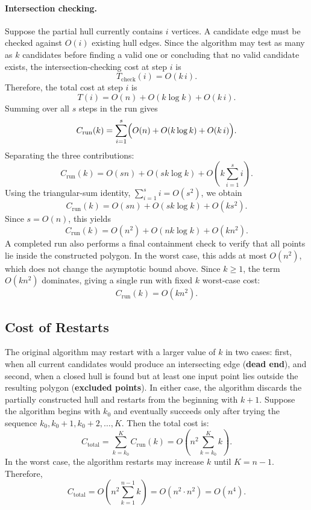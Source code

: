 \documentclass[a4paper,twoside]{article}
\begin{document}
\paragraph{Intersection checking.}
Suppose the partial hull currently contains $i$ vertices. A candidate edge must be checked against $O(i)$ existing hull edges. Since the algorithm may test as many as $k$ candidates before finding a valid one or concluding that no valid candidate exists, the intersection-checking cost at step $i$ is
\[
T_{\mathrm{check}}(i)=O(k\,i).
\]
Therefore, the total cost at step $i$ is
\[
T(i)=O(n)+O(k\log k)+O(k\,i).
\]
Summing over all $s$ steps in the run gives
\[
C_{\mathrm{run}}(k)
=
\sum_{i=1}^{s}\Bigl(O(n)+O(k\log k)+O(k\,i)\Bigr).
\]
Separating the three contributions:
\[
C_{\mathrm{run}}(k)
=
O(sn)+O(sk\log k)+O\!\left(k\sum_{i=1}^{s} i\right).
\]
Using the triangular-sum identity, $\sum_{i=1}^{s} i = O(s^2)$, we obtain
\[
C_{\mathrm{run}}(k)=O(sn)+O(sk\log k)+O(ks^2).
\]
Since $s = O(n)$, this yields
\[
C_{\mathrm{run}}(k)=O(n^2)+O(nk\log k)+O(kn^2).
\]
A completed run also performs a final containment check to verify that all points lie inside the constructed polygon. In the worst case, this adds at most $O(n^2)$, which does not change the asymptotic bound above.
Since $k \ge 1$, the term $O(kn^2)$ dominates, giving a single run with fixed $k$ worst-case cost:
\[
\boxed{C_{\mathrm{run}}(k)=O(kn^2).}
\]
\subsection{Cost of Restarts}
The original algorithm may restart with a larger value of $k$ in two cases: first, when all current candidates would produce an intersecting edge (\textbf{dead end}), and second, when a closed hull is found but at least one input point lies outside the resulting polygon (\textbf{excluded points}). In either case, the algorithm discards the partially constructed hull and restarts from the beginning with $k+1$.
Suppose the algorithm begins with $k_0$ and eventually succeeds only after trying the sequence $k_0, k_0+1, k_0+2, \dots, K$. Then the total cost is:
\[
C_{\mathrm{total}}
=
\sum_{k=k_0}^{K} C_{\mathrm{run}}(k)
=
O\!\left(n^2 \sum_{k=k_0}^{K} k\right).
\]
In the worst case, the algorithm restarts may increase $k$ until $K=n-1$. Therefore,
\[
C_{\mathrm{total}}
=
O\!\left(n^2 \sum_{k=1}^{n-1} k\right)
= O(n^2 \cdot n^2)
= \boxed{O(n^4).}
\]
\end{document}
